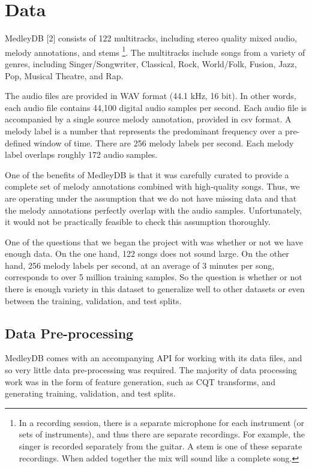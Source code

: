 \documentclass{article} %
\begin{document}
\section{Data} \label{sec:data}

MedleyDB [2] consists of 122 multitracks, including stereo quality mixed audio, melody annotations, and stems \footnote{In a recording session, there is a separate microphone for each instrument (or sets of instruments), and thus there are separate recordings.  For example, the singer is recorded separately from the guitar.  A stem is one of these separate recordings.  When added together the mix will sound like a complete song.}.  The multitracks include songs from a variety of genres, including Singer/Songwriter, Classical, Rock, World/Folk, Fusion, Jazz, Pop, Musical Theatre, and Rap.

The audio files are provided in WAV format (44.1 kHz, 16 bit).  In other words, each audio file contains 44,100 digital audio samples per second.  Each audio file is accompanied by a single source melody annotation, provided in csv format.  A melody label is a number that represents the predominant frequency over a pre-defined window of time.  There are 256 melody labels per second.  Each melody label overlaps roughly 172 audio samples.

One of the benefits of MedleyDB is that it was carefully curated to provide a complete set of melody annotations combined with high-quality songs.  Thus, we are operating under the assumption that we do not have missing data and that the melody annotations perfectly overlap with the audio samples.  Unfortunately, it would not be practically feasible to check this assumption thoroughly.

One of the questions that we began the project with was whether or not we have enough data.  On the one hand, 122 songs does not sound large.  On the other hand, 256 melody labels per second, at an average of 3 minutes per song, corresponds to over 5 million training samples.  So the question is whether or not there is enough variety in this dataset to generalize well to other datasets or even between the training, validation, and test splits.

\subsection{Data Pre-processing}

MedleyDB comes with an accompanying API for working with its data files, and so very little data pre-processing was required.  The majority of data processing work was in the form of feature generation, such as CQT transforms, and generating training, validation, and test splits.
\end{document}
